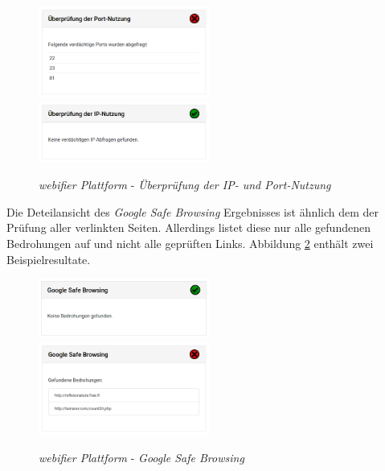 \begin{figure}[H]
\centerline{%
\includegraphics[width=0.5\textwidth]{images/platform/portscan-malicious}%
\includegraphics[width=0.5\textwidth]{images/platform/ipscan-clean}%
}%
\caption{\textit{webifier Plattform} - \textit{Überprüfung der IP- und Port-Nutzung}}
\label{fig:platform-result-portscan}
\end{figure}

Die Deteilansicht des \textit{Google Safe Browsing} Ergebnisses ist ähnlich dem der Prüfung aller
verlinkten Seiten. Allerdings listet diese nur alle gefundenen Bedrohungen auf und nicht alle
geprüften Links. Abbildung \ref{fig:platform-result-google-safe-browsing} enthält zwei Beispielresultate.

\begin{figure}[H]
\centerline{%
\includegraphics[width=0.5\textwidth]{images/platform/google-safe-browsing-clean}%
\includegraphics[width=0.5\textwidth]{images/platform/google-safe-browsing-malicious}%
}%
\caption{\textit{webifier Plattform} - \textit{Google Safe Browsing}}
\label{fig:platform-result-google-safe-browsing}
\end{figure}

\newpage


